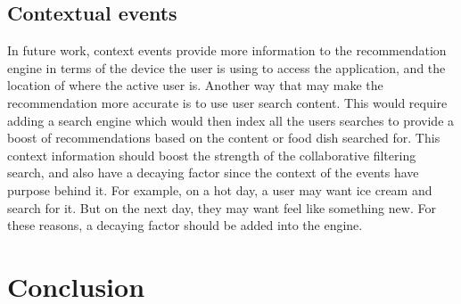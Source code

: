 \subsection{Contextual events}
In future work, context events provide more information to the recommendation engine in terms of the device the user is using to access the application, and the location of where the active user is. Another way that may make the recommendation more accurate is to use user search content. This would require adding a search engine which would then index all the users searches to provide a boost of recommendations based on the content or food dish searched for. This context information should boost the strength of the collaborative filtering search, and also have a decaying factor since the context of the events have purpose behind it. For example, on a hot day, a user may want ice cream and search for it. But on the next day, they may want feel like something new. For these reasons, a decaying factor should be added into the engine.

\section{Conclusion}